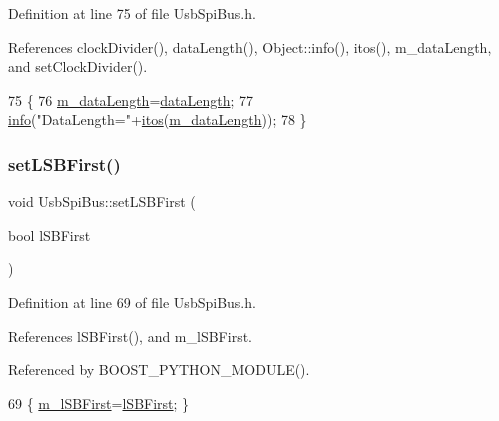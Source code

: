 Definition at line 75 of file Usb\+Spi\+Bus.\+h.



References clock\+Divider(), data\+Length(), Object\+::info(), itos(), m\+\_\+data\+Length, and set\+Clock\+Divider().


\begin{DoxyCode}
75                                      \{
76       \hyperlink{classUsbSpiBus_a2d8b2bddd6d4d5dc53c38b5698737c5c}{m\_dataLength}=\hyperlink{classUsbSpiBus_ae7d38b275b5267f795b2d9f1d561d688}{dataLength};
77       \hyperlink{classObject_a644fd329ea4cb85f54fa6846484b84a8}{info}(\textcolor{stringliteral}{"DataLength="}+\hyperlink{Tools_8h_af330027dbdafb9a30768b3613c553e60}{itos}(\hyperlink{classUsbSpiBus_a2d8b2bddd6d4d5dc53c38b5698737c5c}{m\_dataLength}));
78   \}
\end{DoxyCode}
\mbox{\label{classUsbSpiBus_ab601d59e0b5110c2275c1cc298664e27}} 
\subsubsection{\texorpdfstring{set\+L\+S\+B\+First()}{setLSBFirst()}}
{\footnotesize\ttfamily void Usb\+Spi\+Bus\+::set\+L\+S\+B\+First (\begin{DoxyParamCaption}\item[{bool}]{l\+S\+B\+First }\end{DoxyParamCaption})\hspace{0.3cm}{\ttfamily [inline]}}



Definition at line 69 of file Usb\+Spi\+Bus.\+h.



References l\+S\+B\+First(), and m\+\_\+l\+S\+B\+First.



Referenced by B\+O\+O\+S\+T\+\_\+\+P\+Y\+T\+H\+O\+N\+\_\+\+M\+O\+D\+U\+L\+E().


\begin{DoxyCode}
69 \{ \hyperlink{classUsbSpiBus_a23011787b0425356b011bc7a1c7cff5b}{m\_lSBFirst}=\hyperlink{classUsbSpiBus_af6af49c1ac52cc0586570c1f43d0bc25}{lSBFirst}; \}
\end{DoxyCode}
\mbox{\label{classUsbSpiBus_aa6c039bb03737e9fd943cbdd2b23388c}} 
